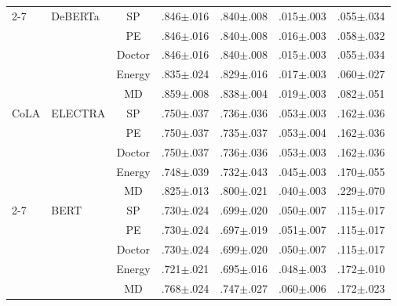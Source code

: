 \begin{table}[h]
\begin{tabular}{@{}llccccc@{}}
\cmidrule(l){2-7}
 & DeBERTa & SP & .846{\scriptsize$\pm$.016} & .840{\scriptsize$\pm$.008} & .015{\scriptsize$\pm$.003} & .055{\scriptsize$\pm$.034} \\
 &  & PE & .846{\scriptsize$\pm$.016} & .840{\scriptsize$\pm$.008} & .016{\scriptsize$\pm$.003} & .058{\scriptsize$\pm$.032} \\
 &  & Doctor & .846{\scriptsize$\pm$.016} & .840{\scriptsize$\pm$.008} & .015{\scriptsize$\pm$.003} & .055{\scriptsize$\pm$.034} \\
 &  & Energy & .835{\scriptsize$\pm$.024} & .829{\scriptsize$\pm$.016} & .017{\scriptsize$\pm$.003} & .060{\scriptsize$\pm$.027} \\
 &  & MD & .859{\scriptsize$\pm$.008} & .838{\scriptsize$\pm$.004} & .019{\scriptsize$\pm$.003} & .082{\scriptsize$\pm$.051} \\
\midrule
CoLA & ELECTRA & SP & .750{\scriptsize$\pm$.037} & .736{\scriptsize$\pm$.036} & .053{\scriptsize$\pm$.003} & .162{\scriptsize$\pm$.036} \\
 &  & PE & .750{\scriptsize$\pm$.037} & .735{\scriptsize$\pm$.037} & .053{\scriptsize$\pm$.004} & .162{\scriptsize$\pm$.036} \\
 &  & Doctor & .750{\scriptsize$\pm$.037} & .736{\scriptsize$\pm$.036} & .053{\scriptsize$\pm$.003} & .162{\scriptsize$\pm$.036} \\
 &  & Energy & .748{\scriptsize$\pm$.039} & .732{\scriptsize$\pm$.043} & .045{\scriptsize$\pm$.003} & .170{\scriptsize$\pm$.055} \\
 &  & MD & .825{\scriptsize$\pm$.013} & .800{\scriptsize$\pm$.021} & .040{\scriptsize$\pm$.003} & .229{\scriptsize$\pm$.070} \\
\cmidrule(l){2-7}
 & BERT & SP & .730{\scriptsize$\pm$.024} & .699{\scriptsize$\pm$.020} & .050{\scriptsize$\pm$.007} & .115{\scriptsize$\pm$.017} \\
 &  & PE & .730{\scriptsize$\pm$.024} & .697{\scriptsize$\pm$.019} & .051{\scriptsize$\pm$.007} & .115{\scriptsize$\pm$.017} \\
 &  & Doctor & .730{\scriptsize$\pm$.024} & .699{\scriptsize$\pm$.020} & .050{\scriptsize$\pm$.007} & .115{\scriptsize$\pm$.017} \\
 &  & Energy & .721{\scriptsize$\pm$.021} & .695{\scriptsize$\pm$.016} & .048{\scriptsize$\pm$.003} & .172{\scriptsize$\pm$.010} \\
 &  & MD & .768{\scriptsize$\pm$.024} & .747{\scriptsize$\pm$.027} & .060{\scriptsize$\pm$.006} & .172{\scriptsize$\pm$.023} \\

\end{tabular}
\end{table}

